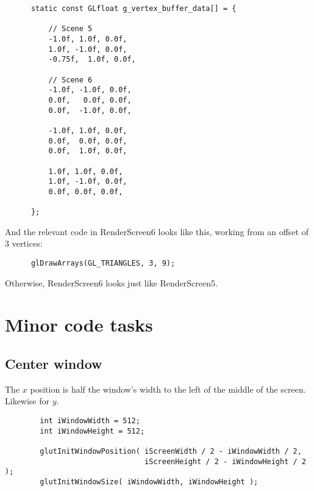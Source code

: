 \documentclass[11pt,a4paper]{article}
\begin{document}
    \begin{verbatim}
      static const GLfloat g_vertex_buffer_data[] = {

          // Scene 5
          -1.0f, 1.0f, 0.0f,
          1.0f, -1.0f, 0.0f,
          -0.75f,  1.0f, 0.0f,

          // Scene 6
          -1.0f, -1.0f, 0.0f,
          0.0f,   0.0f, 0.0f,
          0.0f,  -1.0f, 0.0f,

          -1.0f, 1.0f, 0.0f,
          0.0f,  0.0f, 0.0f,
          0.0f,  1.0f, 0.0f,

          1.0f, 1.0f, 0.0f,
          1.0f, -1.0f, 0.0f,
          0.0f, 0.0f, 0.0f,

      };
    \end{verbatim}

    And the relevant code in RenderScreen6 looks like this, working from an offset of 3 vertices:

    \begin{verbatim}
      glDrawArrays(GL_TRIANGLES, 3, 9);
    \end{verbatim}

    Otherwise, RenderScreen6 looks just like RenderScreen5.


  \section{Minor code tasks} %
  \label{sec1}

    \subsection{Center window} %
    \label{sub:center_window}
      
      The $x$ position is half the window's width to the left of the middle of the screen.
      Likewise for $y$.

      \begin{verbatim}
        int iWindowWidth = 512;
        int iWindowHeight = 512;
        
        glutInitWindowPosition( iScreenWidth / 2 - iWindowWidth / 2,
                                iScreenHeight / 2 - iWindowHeight / 2 );
        glutInitWindowSize( iWindowWidth, iWindowHeight );
      \end{verbatim}

  
\end{document}
